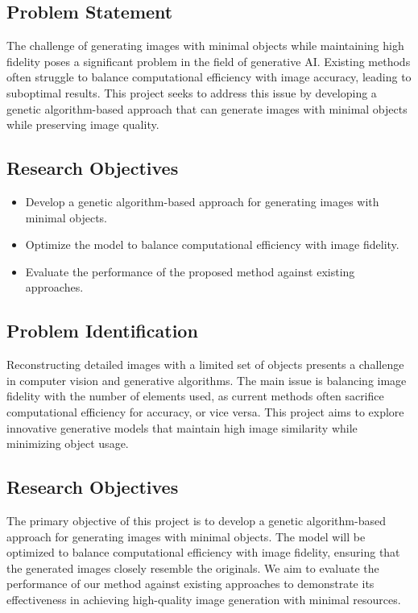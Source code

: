 \documentclass[10pt, conference]{IEEEtran}
\begin{document}
\subsection{Problem Statement}
The challenge of generating images with minimal objects while maintaining high fidelity poses a significant problem in the field of generative AI. Existing methods often struggle to balance computational efficiency with image accuracy, leading to suboptimal results. This project seeks to address this issue by developing a genetic algorithm-based approach that can generate images with minimal objects while preserving image quality.
\subsection{Research Objectives}
\begin{itemize}
	\item Develop a genetic algorithm-based approach for generating images with minimal objects.
	\item Optimize the model to balance computational efficiency with image fidelity.
	\item Evaluate the performance of the proposed method against existing approaches.
\end{itemize}

\subsection{Problem Identification}
Reconstructing detailed images with a limited set of objects presents a challenge in computer vision and generative algorithms. The main issue is balancing image fidelity with the number of elements used, as current methods often sacrifice computational efficiency for accuracy, or vice versa. This project aims to explore innovative generative models that maintain high image similarity while minimizing object usage.

\subsection{Research Objectives}
The primary objective of this project is to develop a genetic algorithm-based approach for generating images with minimal objects. The model will be optimized to balance computational efficiency with image fidelity, ensuring that the generated images closely resemble the originals. We aim to evaluate the performance of our method against existing approaches to demonstrate its effectiveness in achieving high-quality image generation with minimal resources.
\end{document}
